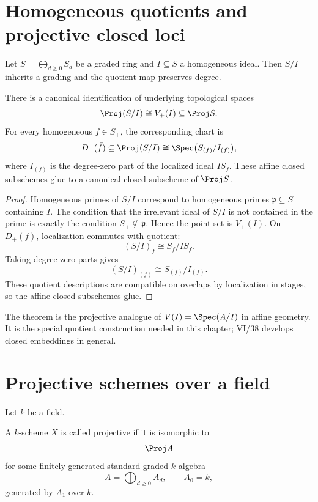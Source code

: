 

\section{Homogeneous quotients and projective closed loci}
Let \(S=\bigoplus_{d\ge0}S_d\) be a graded ring and \(I\subseteq S\) a homogeneous ideal.  Then \(S/I\) inherits a grading and the quotient map preserves degree.

\begin{theorem}\label{thm:vi37-quotient-proj}
There is a canonical identification of underlying topological spaces
\[
  \Proj(S/I)\cong V_+(I)\subseteq\Proj S.
\]
For every homogeneous \(f\in S_+\), the corresponding chart is
\[
  D_+(\bar f)\subseteq\Proj(S/I)
  \cong
  \Spec\bigl(S_{(f)}/I_{(f)}\bigr),
\]
where \(I_{(f)}\) is the degree-zero part of the localized ideal \(IS_f\).
These affine closed subschemes glue to a canonical closed subscheme of \(\Proj S\).
\end{theorem}

\begin{proof}
Homogeneous primes of \(S/I\) correspond to homogeneous primes \(\mathfrak p\subseteq S\) containing \(I\).  The condition that the irrelevant ideal of \(S/I\) is not contained in the prime is exactly the condition \(S_+\not\subseteq\mathfrak p\).  Hence the point set is \(V_+(I)\).  On \(D_+(f)\), localization commutes with quotient:
\[
  (S/I)_f\cong S_f/IS_f.
\]
Taking degree-zero parts gives
\[
  (S/I)_{(f)}\cong S_{(f)}/I_{(f)}.
\]
These quotient descriptions are compatible on overlaps by localization in stages, so the affine closed subschemes glue.
\end{proof}

The theorem is the projective analogue of \(V(I)=\Spec(A/I)\) in affine geometry.  It is the special quotient construction needed in this chapter; VI/38 develops closed embeddings in general.

\section{Projective schemes over a field}
Let \(k\) be a field.

\begin{definition}\label{def:vi37-projective-scheme}
A \(k\)-scheme \(X\) is called projective if it is isomorphic to
\[
  \Proj A
\]
for some finitely generated standard graded \(k\)-algebra
\[
  A=\bigoplus_{d\ge0}A_d,
  \qquad A_0=k,
\]
generated by \(A_1\) over \(k\).
\end{definition}

